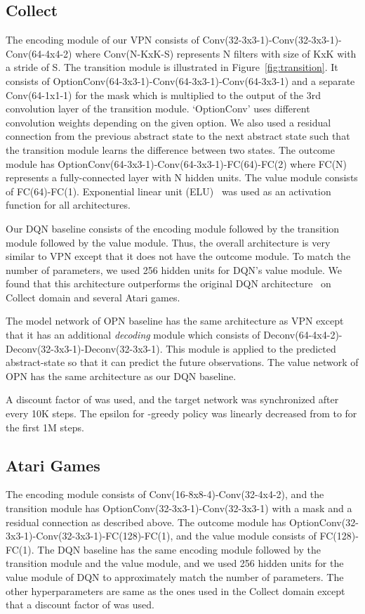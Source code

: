\documentclass{article}
\begin{document}
\subsection{Collect}
The encoding module of our VPN consists of Conv(32-3x3-1)-Conv(32-3x3-1)-Conv(64-4x4-2) where Conv(N-KxK-S) represents N filters with size of KxK with a stride of S. The transition module is illustrated in Figure~\ref{fig:transition}. It consists of OptionConv(64-3x3-1)-Conv(64-3x3-1)-Conv(64-3x3-1) and a separate Conv(64-1x1-1) for the mask which is multiplied to the output of the 3rd convolution layer of the transition module. `OptionConv' uses different convolution weights depending on the given option. We also used a residual connection from the previous abstract state to the next abstract state such that the transition module learns the difference between two states. The outcome module has OptionConv(64-3x3-1)-Conv(64-3x3-1)-FC(64)-FC(2) where FC(N) represents a fully-connected layer with N hidden units. The value module consists of FC(64)-FC(1). Exponential linear unit (ELU)~\citep{Clevert2015FastAA} was used as an activation function for all architectures.

Our DQN baseline consists of the encoding module followed by the transition module followed by the value module. Thus, the overall architecture is very similar to VPN except that it does not have the outcome module. To match the number of parameters, we used 256 hidden units for DQN's value module. We found that this architecture outperforms the original DQN architecture~\citep{mnih2015human} on Collect domain and several Atari games.

The model network of OPN baseline has the same architecture as VPN except that it has an additional \textit{decoding} module which consists of Deconv(64-4x4-2)-Deconv(32-3x3-1)-Deconv(32-3x3-1). This module is applied to the predicted abstract-state so that it can predict the future observations. The value network of OPN has the same architecture as our DQN baseline.

A discount factor of  was used, and the target network was synchronized after every 10K steps. The epsilon for -greedy policy was linearly decreased from  to  for the first 1M steps.

\subsection{Atari Games}
The encoding module consists of Conv(16-8x8-4)-Conv(32-4x4-2), and the transition module has OptionConv(32-3x3-1)-Conv(32-3x3-1) with a mask and a residual connection as described above. The outcome module has OptionConv(32-3x3-1)-Conv(32-3x3-1)-FC(128)-FC(1), and the value module consists of FC(128)-FC(1). The DQN baseline has the same encoding module followed by the transition module and the value module, and we used 256 hidden units for the value module of DQN to approximately match the number of parameters. The other hyperparameters are same as the ones used in the Collect domain except that a discount factor of  was used. 
\end{document}
